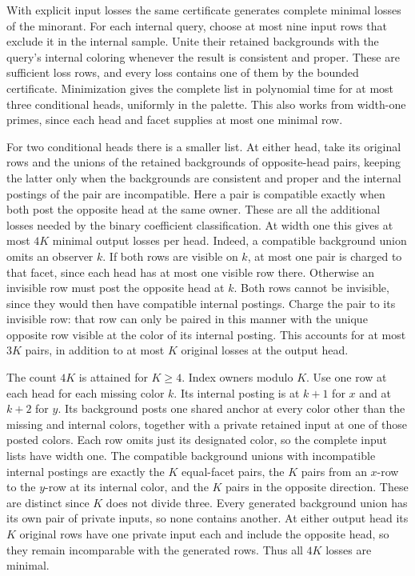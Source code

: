 With explicit input losses the same certificate
generates complete minimal losses of the minorant.
For each internal query, choose at most nine
input rows that exclude it in the internal
sample. Unite their retained backgrounds with
the query's internal coloring whenever the
result is consistent and proper. These are
sufficient loss rows, and every loss contains
one of them by the bounded certificate.
Minimization gives the complete list in
polynomial time for at most three conditional
heads, uniformly in the palette. This also
works from width-one primes, since each
head and facet supplies at most one minimal
row.

For two conditional heads there is a smaller
list. At either head, take its original rows
and the unions of the retained backgrounds of
opposite-head pairs, keeping the latter only
when the backgrounds are consistent and
proper and the internal postings of the pair
are incompatible. Here a pair is compatible
exactly when both post the opposite head at
the same owner. These are all the additional
losses needed by the binary coefficient
classification. At width one this gives
at most $4K$ minimal output losses per head.
Indeed, a compatible background union
omits an observer $k$. If both rows are
visible on $k$, at most one pair is charged
to that facet, since each head has at most
one visible row there. Otherwise an
invisible row must post the opposite head
at $k$. Both rows cannot be invisible,
since they would then have compatible
internal postings. Charge the pair to its
invisible row: that row can only be paired
in this manner with the unique opposite
row visible at the color of its internal
posting. This accounts for at most $3K$
pairs, in addition to at most $K$ original
losses at the output head.

The count $4K$ is attained for $K\geq4$.
Index owners modulo $K$. Use one row at
each head for each missing color $k$.
Its internal posting is at $k+1$ for $x$
and at $k+2$ for $y$. Its background posts
one shared anchor at every color other than
the missing and internal colors, together
with a private retained input at one of
those posted colors. Each row omits just
its designated color, so the complete
input lists have width one. The compatible
background unions with incompatible internal
postings are exactly the $K$ equal-facet
pairs, the $K$ pairs from an $x$-row to the
$y$-row at its internal color, and the
$K$ pairs in the opposite direction.
These are distinct since $K$ does not
divide three. Every generated background
union has its own pair of private inputs,
so none contains another. At either output
head its $K$ original rows have one private
input each and include the opposite head,
so they remain incomparable with the
generated rows. Thus all $4K$ losses
are minimal.

